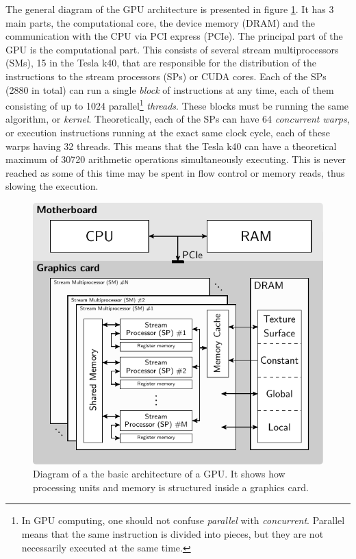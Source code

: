 The general diagram of the GPU architecture is presented in figure \ref{fig:GPUarch}. It has 3 main parts, the computational core, the device memory (DRAM) and the communication with the CPU via PCI express (PCIe).
The principal part of the GPU is the computational part. This consists of several stream multiprocessors (SMs), 15 in the Tesla k40, that are responsible for the distribution of the instructions to the stream processors (SPs) or CUDA cores. Each of the SPs (2880 in total) can run a single \textit{block} of instructions at any time, each of them consisting of up to 1024 parallel\footnote{In GPU computing, one should not confuse \textit{parallel} with \textit{concurrent}. Parallel means that the same instruction is divided into pieces, but they are not necessarily executed at the same time.} \textit{threads}. These blocks must be running the same algorithm, or \textit{kernel}. Theoretically, each of the SPs can have 64 \textit{concurrent warps}, or execution instructions running at the exact same clock cycle, each of these warps having 32 threads. This means that the Tesla k40 can have a theoretical maximum of 30720 arithmetic operations simultaneously executing. This is never reached as some of this time may be spent in flow control or memory reads, thus slowing the execution. 

\begin{figure}
\begin{center}

\includegraphics[width=\textwidth]{GPUmethods/architecture-figure0.pdf} 
\end{center}

\caption[Block diagram of a GPU architecture]{\label{fig:GPUarch} Diagram of a the basic architecture of a GPU. It shows how processing units and memory is structured inside a graphics card.} 
\end{figure}



